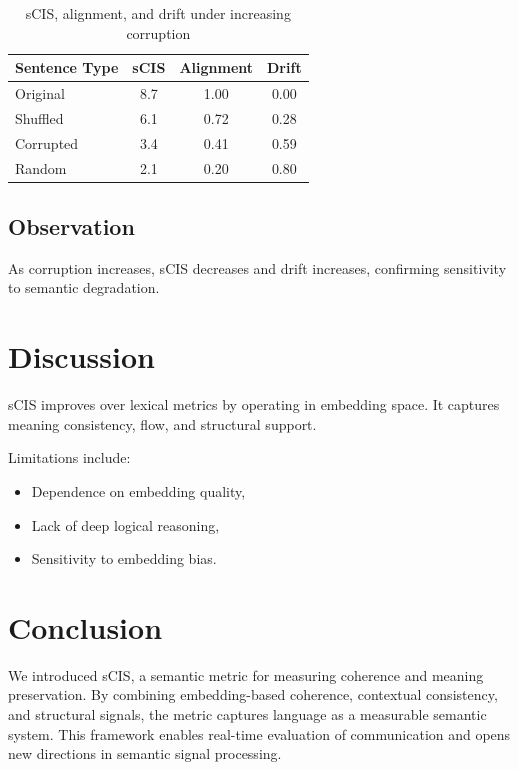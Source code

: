 \documentclass{article}
\theoremstyle{definition}
\begin{document}
\begin{table}[htbp]
\centering
\caption{sCIS, alignment, and drift under increasing corruption}
\begin{tabular}{lccc}
\toprule
Sentence Type & sCIS & Alignment & Drift \\
\midrule
Original & 8.7 & 1.00 & 0.00 \\
Shuffled & 6.1 & 0.72 & 0.28 \\
Corrupted & 3.4 & 0.41 & 0.59 \\
Random & 2.1 & 0.20 & 0.80 \\
\bottomrule
\end{tabular}
\end{table}

\subsection{Observation}
As corruption increases, sCIS decreases and drift increases, confirming sensitivity to semantic degradation.

\section{Discussion}

sCIS improves over lexical metrics by operating in embedding space. It captures meaning consistency, flow, and structural support.

Limitations include:
\begin{itemize}[noitemsep]
    \item Dependence on embedding quality,
    \item Lack of deep logical reasoning,
    \item Sensitivity to embedding bias.
\end{itemize}

\section{Conclusion}

We introduced sCIS, a semantic metric for measuring coherence and meaning preservation. By combining embedding-based coherence, contextual consistency, and structural signals, the metric captures language as a measurable semantic system. This framework enables real-time evaluation of communication and opens new directions in semantic signal processing.
\end{document}
